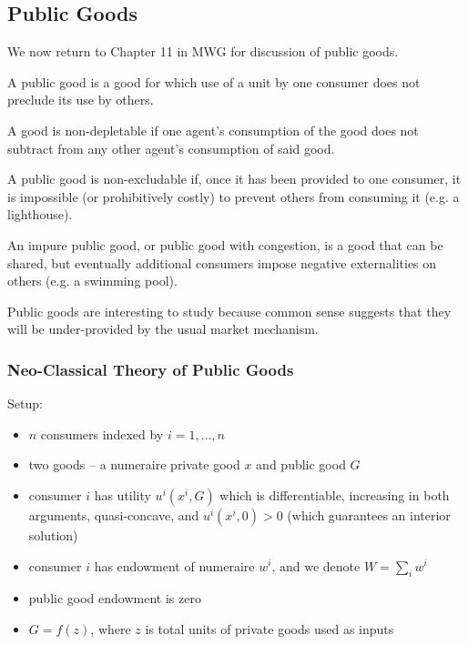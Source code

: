 \subsection{Public Goods}
\label{sec:public-goods}

We now return to Chapter 11 in MWG for discussion of public goods.

\begin{definition}
  A public good is a good for which use of a unit by one consumer does
  not preclude its use by others.
\end{definition}

\begin{definition}
  A good is non-depletable if one agent's consumption of the good does
  not subtract from any other agent's consumption of said good.
\end{definition}

\begin{definition}[Excludability]
  A public good is non-excludable if, once it has been provided to one
  consumer, it is impossible (or prohibitively costly) to prevent
  others from consuming it (e.g. a lighthouse). 
\end{definition}

\begin{definition}
  An impure public good, or public good with congestion, is a good
  that can be shared, but eventually additional consumers impose
  negative externalities on others (e.g. a swimming pool).
\end{definition}

Public goods are interesting to study because common sense suggests
that they will be under-provided by the usual market mechanism.

\subsubsection{Neo-Classical Theory of Public Goods}

Setup:
\begin{itemize}
\item $n$ consumers indexed by $i = 1, \dots, n$
\item two goods -- a numeraire private good $x$ and public good $G$
\item consumer $i$ has utility $u^i(x^i, G)$ which is differentiable,
  increasing in both arguments, quasi-concave, and $u^i(x^i, 0) > 0$
  (which guarantees an interior solution)
\item consumer $i$ has endowment of numeraire $w^i$, and we denote $W
  = \sum_i w^i$
\item public good endowment is zero
\item $G = f(z)$, where $z$ is total units of private goods used as
  inputs
\end{itemize}

